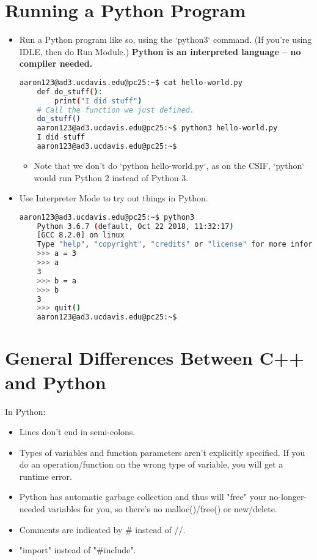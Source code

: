 \documentclass{article}
\begin{document}
\section{Running a Python Program}
\begin{itemize}
    \item Run a Python program like so, using the `python3` command. (If you're using IDLE, then do Run Module.) \textbf{Python is an interpreted language -- no compiler needed.}
    \begin{lstlisting}[language=bash]
    aaron123@ad3.ucdavis.edu@pc25:~$ cat hello-world.py 
    def do_stuff():
        print("I did stuff")
    # Call the function we just defined.
    do_stuff()
    aaron123@ad3.ucdavis.edu@pc25:~$ python3 hello-world.py 
    I did stuff
    aaron123@ad3.ucdavis.edu@pc25:~$ 
    \end{lstlisting}
    \begin{itemize}
        \item Note that we don't do `python hello-world.py`, as on the CSIF, `python` would run Python 2 instead of Python 3.
    \end{itemize}
    \item Use Interpreter Mode to try out things in Python.
    \begin{lstlisting}[language=bash]
    aaron123@ad3.ucdavis.edu@pc25:~$ python3
    Python 3.6.7 (default, Oct 22 2018, 11:32:17) 
    [GCC 8.2.0] on linux
    Type "help", "copyright", "credits" or "license" for more information.
    >>> a = 3
    >>> a
    3
    >>> b = a
    >>> b
    3
    >>> quit()
    aaron123@ad3.ucdavis.edu@pc25:~$ 
    \end{lstlisting}
\end{itemize}

\section{General Differences Between C++ and Python}
In Python:
\begin{itemize}
    \item Lines don't end in semi-colons.
    \item Types of variables and function parameters aren't explicitly specified. If you do an operation/function on the wrong type of variable, you will get a runtime error.
    \item Python has automatic garbage collection and thus will "free" your no-longer-needed variables for you, so there's no malloc()/free() or new/delete.
    \item Comments are indicated by \# instead of //.
    \item "import" instead of "\#include".
\end{itemize}
\end{document}
